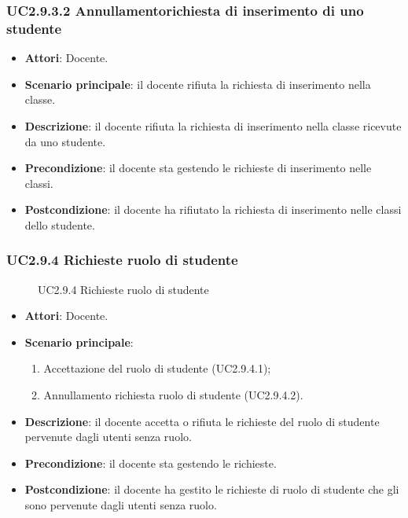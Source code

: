 \subsubsection{UC2.9.3.2 Annullamentorichiesta di inserimento di uno studente}
\begin{itemize}
\item \textbf{Attori}: Docente.
\item \textbf{Scenario principale}: il docente rifiuta la richiesta di inserimento nella classe.
\item \textbf{Descrizione}: il docente rifiuta la richiesta di inserimento nella classe ricevute da uno studente.
\item \textbf{Precondizione}: il docente sta gestendo le richieste di inserimento nelle classi.
\item \textbf{Postcondizione}: il docente ha rifiutato la richiesta di inserimento nelle classi dello studente.
\end{itemize}
\subsubsection{UC2.9.4 Richieste ruolo di studente}
\begin{figure}[H]
\centering
\noindent{}
\caption{UC2.9.4 Richieste ruolo di studente}
\end{figure}
\begin{itemize}
\item \textbf{Attori}: Docente.
\item \textbf{Scenario principale}:
\begin{enumerate}
\item Accettazione del ruolo di studente (UC2.9.4.1);
\item Annullamento richiesta ruolo di studente (UC2.9.4.2).
\end{enumerate}
\item \textbf{Descrizione}: il docente accetta o rifiuta le richieste del ruolo di studente pervenute dagli utenti senza ruolo.
\item \textbf{Precondizione}: il docente sta gestendo le richieste.
\item \textbf{Postcondizione}: il docente ha gestito le richieste di ruolo di studente che gli sono pervenute dagli utenti senza ruolo.
\end{itemize}
